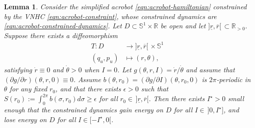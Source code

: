 \documentclass[journal,twoside,web, twocolumn,draftcls]{ieeecolor}
\newtheorem{lemma}{Lemma} %
\newcommand*{\R}{\mathbb{R}}
\newcommand*{\Sone}{\mathbb{S}^1}
\newcommand*{\SxR}{\Sone \times \R}
\begin{document}
\begin{lemma}\label{lemma:energy-regulation-D}
    Consider the simplified acrobot \eqref{eqn:acrobot-hamiltonian} constrained
    by the VNHC \eqref{eqn:acrobot-constraint}, whose constrained dynamics are
    \eqref{eqn:acrobot-constrained-dynamics}.
    Let \(D \subset \SxR\) be open and 
    let \(]\underline{r}, \overline{r}[ \, \subset \R_{> 0}\).
    Suppose there exists a diffeomorphism 
    \begin{align*}
        T : D &\to ]\underline{r},\overline{r}[ \, \times \Sone
         \\
        (q_u,p_u) &\mapsto (r,\theta)
        ,
    \end{align*}
    satisfying \(\dot{r} \equiv 0\) and \(\dot{\theta} > 0\) when
    \(I = 0\).
    Let \(g(\theta,r,I) = \dot{r}/\dot{\theta}\) and assume that 
    \((\partial g/\partial r)(\theta,r,0) \equiv 0\).
    Assume \(b(\theta,r_0) = (\partial g/\partial I)(\theta,r_0,0)\)
    is \(2\pi\)-periodic in \(\theta\) for any fixed \(r_0\),
    and that there exists \(\epsilon > 0\) such that 
    \(S(r_0) := \int_0^{2\pi} b(\sigma,r_0)d\sigma \geq \epsilon\)
    for all \(r_0 \in \, ]\underline{r},\overline{r}[\).
    Then there exists \(I^\star > 0\) small enough that the constrained dynamics
    gain energy on \(D\) for all \(I \in \,]0, I^\star]\), and lose energy on \(D\)
    for all \(I \in [-I^\star, 0[\).
\end{lemma}
\end{document}
